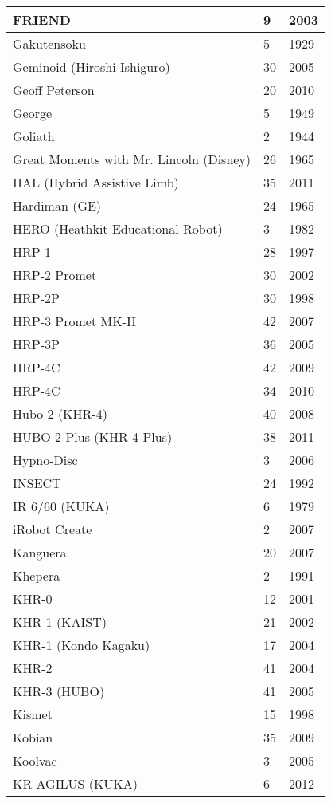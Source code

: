\begin{center}
\begin{longtable}{l | l | l }
FRIEND	&	9	&	2003	\\	\hline
Gakutensoku	&	5	&	1929	\\	\hline
Geminoid (Hiroshi Ishiguro)	&	30	&	2005	\\	\hline
Geoff Peterson	&	20	&	2010	\\	\hline
George	&	5	&	1949	\\	\hline
Goliath	&	2	&	1944	\\	\hline
Great Moments with Mr. Lincoln (Disney)	&	26	&	1965	\\	\hline
HAL (Hybrid Assistive Limb)	&	35	&	2011	\\	\hline
Hardiman (GE)	&	24	&	1965	\\	\hline
HERO (Heathkit Educational Robot)	&	3	&	1982	\\	\hline
HRP-1	&	28	&	1997	\\	\hline
HRP-2 Promet	&	30	&	2002	\\	\hline
HRP-2P	&	30	&	1998	\\	\hline
HRP-3 Promet MK-II	&	42	&	2007	\\	\hline
HRP-3P	&	36	&	2005	\\	\hline
HRP-4C	&	42	&	2009	\\	\hline
HRP-4C	&	34	&	2010	\\	\hline
Hubo 2 (KHR-4)	&	40	&	2008	\\	\hline
HUBO 2 Plus (KHR-4 Plus)	&	38	&	2011	\\	\hline
Hypno-Disc	&	3	&	2006	\\	\hline
INSECT	&	24	&	1992	\\	\hline
IR 6/60  (KUKA)	&	6	&	1979	\\	\hline
iRobot Create	&	2	&	2007	\\	\hline
Kanguera	&	20	&	2007	\\	\hline
Khepera	&	2	&	1991	\\	\hline
KHR-0 	&	12	&	2001	\\	\hline
KHR-1 (KAIST)	&	21	&	2002	\\	\hline
KHR-1 (Kondo Kagaku)	&	17	&	2004	\\	\hline
KHR-2	&	41	&	2004	\\	\hline
KHR-3 (HUBO)	&	41	&	2005	\\	\hline
Kismet \cite{robotKismetScassellati98eyefinding}	&	15	&	1998	\\	\hline
Kobian	&	35	&	2009	\\	\hline
Koolvac	&	3	&	2005	\\	\hline
KR AGILUS (KUKA)	&	6	&	2012	\\	\hline

\end{longtable}
\end{center}
